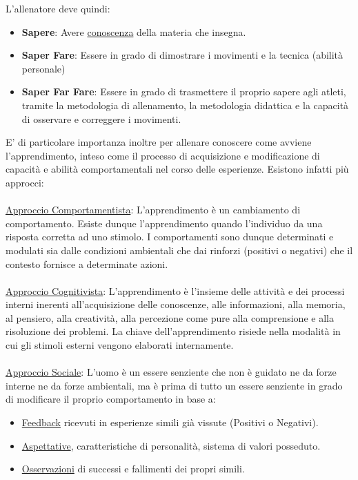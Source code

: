 \documentclass[../uefaC.tex]{subfiles}
\begin{document}
L'allenatore deve quindi:
\begin{itemize}
    \item \textbf{Sapere}: Avere \underline{conoscenza} della materia che insegna.
    \item \textbf{Saper Fare}: Essere in grado di dimostrare i movimenti e la tecnica (abilità personale)
    \item \textbf{Saper Far Fare}: Essere in grado di trasmettere il proprio sapere agli atleti, tramite la metodologia di allenamento, la metodologia didattica e la capacità di osservare e correggere i movimenti.
\end{itemize}
E' di particolare importanza inoltre per allenare conoscere come avviene l'apprendimento, inteso come il processo di acquisizione e modificazione di capacità e abilità comportamentali nel corso delle esperienze. Esistono infatti più approcci: \hfill \\
\hfill \\ 
\underline{Approccio Comportamentista}: L'apprendimento è un cambiamento di comportamento. Esiste dunque l'apprendimento quando l'individuo da una risposta corretta ad uno stimolo. I comportamenti sono dunque determinati e modulati sia dalle condizioni ambientali che dai rinforzi (positivi o negativi) che il contesto fornisce a determinate azioni. \hfill \\ 
\hfill \\ 
\underline{Approccio Cognitivista}: L'apprendimento è l'insieme delle attività e dei processi interni inerenti all'acquisizione delle conoscenze, alle informazioni, alla memoria, al pensiero, alla creatività, alla percezione come pure alla comprensione e alla risoluzione dei problemi. La chiave dell'apprendimento risiede nella modalità in cui gli stimoli esterni vengono elaborati internamente. \hfill \\ 
\hfill \\ 
\underline{Approccio Sociale}: L'uomo è un essere senziente che non è guidato ne da forze interne ne da forze ambientali, ma è prima di tutto un essere senziente in grado di modificare il proprio comportamento in base a:
\begin{itemize}
    \item \underline{Feedback} ricevuti in esperienze simili già vissute (Positivi o Negativi).
    \item \underline{Aspettative}, caratteristiche di personalità, sistema di valori posseduto.
    \item \underline{Osservazioni} di successi e fallimenti dei propri simili.
\end{itemize}
\end{document}
